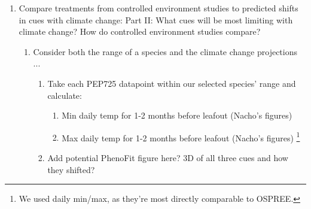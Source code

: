 \documentclass[11pt,letterpaper]{article}
\begin{document}
\begin{enumerate}
\begin{enumerate}
\item Quick intro to the data, how long, which cues .... 
\begin{enumerate}
\item Fig: Number of studies by year (OSPREE)
\item Fig: Map of studies, color coded or such by which of the three cues they manipulated
\end{enumerate}
\item For each of the three cues:
\begin{enumerate}
\item  X\% of studies manipulated that cue
\item Variation across latitude (and hemispheres?), continents, and time (and species)? 
\item Fig: Variation in treatments across space (photo/chill/force)
\item Fig: Variation in treatments across time (graph with year on $x$-axis or divide time in half or such? 
\item Say something about material (seeds/saplings/cuttings)? Can we tie to relevance of predicting future forest communities or such?
\end{enumerate}
\item X\% of studies manipulated which interacting cues? (i.e., how many studies manipulate 1 cues, 2 cues, 3 cues ... of those manipulating 1 cue, what is the breakdown by cue etc.)
\end{enumerate}
\item Compare treatments from controlled environment studies to predicted shifts in cues with climate change: Part II: What cues will be most limiting with climate change? How do controlled environment studies compare? 
\begin{enumerate}
\item Consider both the range of a species and the climate change projections ...
\begin{enumerate}
\item Take each PEP725 datapoint within our selected species' range and calculate:
\begin{enumerate}
\item Min daily temp for 1-2 months before leafout (Nacho's figures)
\item Max daily temp for 1-2 months before leafout (Nacho's figures) \footnote{We used daily min/max, as they're most directly comparable to OSPREE.}
\end{enumerate}
\item Add potential PhenoFit figure here? 3D of all three cues and how they shifted?

\end{enumerate}
\end{enumerate}
\end{enumerate}
\end{document}
